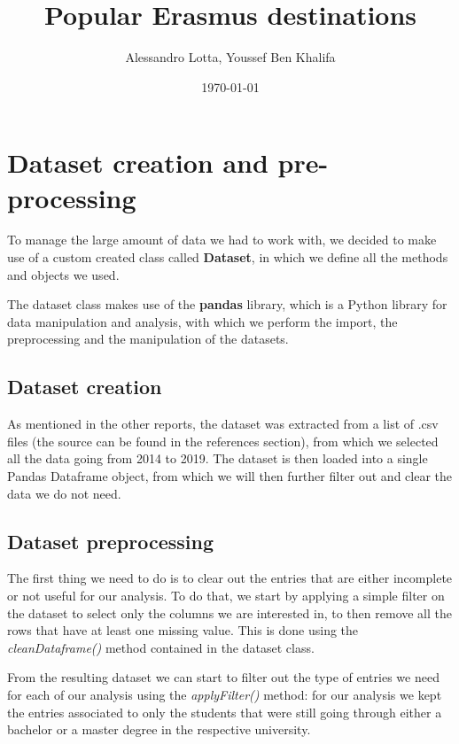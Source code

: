 
\usepackage{hyperref}
\usepackage{xurl}
\usepackage{listings}
\usepackage{subcaption}
\title{Popular Erasmus destinations}
\author{Alessandro Lotta, Youssef Ben Khalifa}
\date{\today}

\maketitle \tableofcontents 
\newpage

\section{Dataset creation and pre-processing}
To manage the large amount of data we had to work with, we decided to make use of a custom created class called \textbf{Dataset}, in which we define all the 
methods and objects we used. 

The dataset class makes use of the \textbf{pandas} library, which is a Python library for data manipulation and analysis, with which 
we perform the import, the preprocessing and the manipulation of the datasets. 
\subsection*{Dataset creation}
As mentioned in the other reports, the dataset was extracted from a list of .csv files (the source can be found in the references section), from which 
we selected all the data going from 2014 to 2019. The dataset is then loaded into a single Pandas Dataframe object, from which we will then further 
filter out and clear the data we do not need. 

\subsection*{Dataset preprocessing}
The first thing we need to do is to clear out the entries that are either incomplete or not useful for our analysis. To do that, 
we start by applying a simple filter on the dataset to select only the columns we are interested in, to then remove all 
the rows that have at least one missing value. This is done using the \textit{cleanDataframe()} method contained in the dataset class. 

From the resulting dataset we can start to filter out the type of entries we need for each of our analysis using the \textit{applyFilter()} method: 
for our analysis we kept the entries associated to only the students that were still going through either a bachelor or a master degree in the respective
university.

